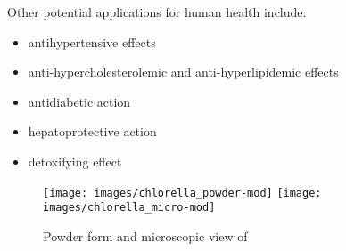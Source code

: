 Other potential applications for human health include:
\begin{itemize}
\item antihypertensive effects
\item anti-hypercholesterolemic and anti-hyperlipidemic effects
\item antidiabetic action
\item hepatoprotective action
\item detoxifying effect~\parencite{bito_Potential_2020}
\end{itemize}

\begin{figure}[H]
\centering
	\subcaptionbox*{\label{subfig:chlorella_powder}}%
		{\texttt{[image: images/chlorella\_powder-mod]}}%
\hfill
	\subcaptionbox*{\label{subfig:chlorella_micro}}%
		{\texttt{[image: images/chlorella\_micro-mod]}}%
\caption{Powder form and microscopic view of }
\label{fig:chlorella_views}
\end{figure}

